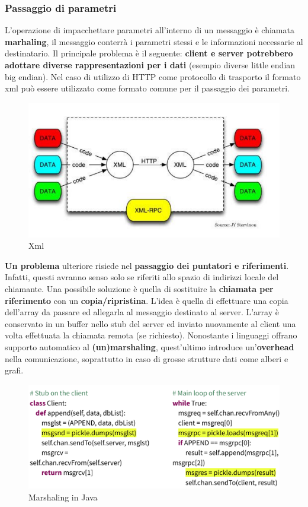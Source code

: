 \documentclass[12pt]{article}
\begin{document}
		\subsubsection{Passaggio di parametri}
			L'operazione di impacchettare parametri all'interno di un messaggio è chiamata \textbf{marhaling}, il messaggio conterrà i parametri stessi e le informazioni necessarie al destinatario. Il principale problema è il seguente: \textbf{client e server potrebbero adottare diverse rappresentazioni per i dati} (esempio diverse little endian big endian). Nel caso di utilizzo di HTTP come protocollo di trasporto il formato xml può essere utilizzato come formato comune per il passaggio dei parametri.
			\begin{figure}[h!]
				\centering
				\includegraphics[scale=0.50]{img/xml.png}
				\caption{Xml }
			\end{figure}
		
			\textbf{Un problema} ulteriore risiede nel \textbf{passaggio dei puntatori e riferimenti}. Infatti, questi avranno senso solo se riferiti allo spazio di indirizzi locale del chiamante. Una possibile soluzione è quella di sostituire la \textbf{chiamata per riferimento} con un \textbf{copia/ripristina}. L'idea è quella di effettuare una copia dell'array da passare ed allegarla al messaggio destinato al server. L'array è conservato in un buffer nello stub del server ed inviato nuovamente al client una volta effettuata la chiamata remota (se richiesto). Nonostante i linguaggi offrano supporto automatico al \textbf{(un)marshaling}, quest'ultimo introduce un'\textbf{overhead} nella comunicazione, soprattutto in caso di grosse strutture dati come alberi e grafi.
			
			\begin{figure}[h!]
				\centering
				\includegraphics[scale=0.25]{img/rpccode.png}
				\caption{Marshaling in Java  }
			\end{figure}   
		
\end{document}
